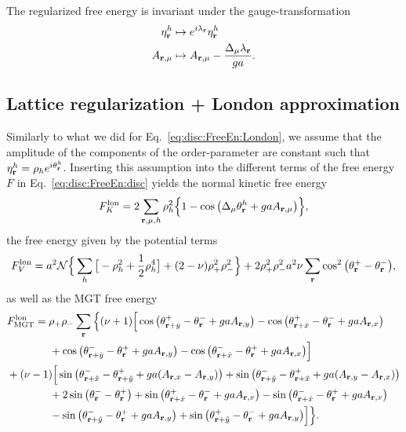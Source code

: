 The regularized free energy is invariant under the gauge-transformation
\begin{subequations}
  \begin{align}
	\eta^h_{\boldsymbol{\mathbf{r}}}&\mapsto e^{i\lambda_{\boldsymbol{\mathbf{r}}}}\eta^h_{\boldsymbol{\mathbf{r}}} \label{eq:disc:Gauge:disc:A}\\
	A_{{\boldsymbol{\mathbf{r}}},\mu} &\mapsto A_{{\boldsymbol{\mathbf{r}}},\mu} - \frac{\Delta_\mu\lambda_{\boldsymbol{\mathbf{r}}}}{ga}.
	\label{eq:disc:Gauge:disc:A}
  \end{align}
  \label{eq:disc:Gauge:disc}
\end{subequations}

\subsection{Lattice regularization + London approximation}

Similarly to what we did for Eq.~\eqref{eq:disc:FreeEn:London}, we assume that the amplitude of the components of the order-parameter are constant such that $\eta^h_{\boldsymbol{\mathbf{r}}} = \rho_he^{i\theta^h_{\boldsymbol{\mathbf{r}}}}$.
Inserting this assumption into the different terms of the free energy $F$ in Eq.~\eqref{eq:disc:FreeEn:disc} yields the normal kinetic free energy
\begin{equation}
  F^\text{lon}_K = 2\sum_{{\boldsymbol{\mathbf{r}}},\mu,h}\rho_h^2\Big\{1-\cos\big(\Delta_\mu\theta^h_{\boldsymbol{\mathbf{r}}}+gaA_{{\boldsymbol{\mathbf{r}}},\mu}\big)\Big\},
  \label{eq:disc:FreeEn:lonDis:K}
\end{equation}
the free energy given by the potential terms
\begin{equation}
  F^\text{lon}_V = a^2\mathcal{N}\Big\{\sum_h\big[-\rho_h^2 + \frac{1}{2}\rho_h^4\big] + (2-\nu)\rho_+^2\rho_-^2\Big\} + 2\rho_+^2\rho_-^2a^2\nu\sum_{\boldsymbol{\mathbf{r}}}\cos^2\big(\theta^+_{\boldsymbol{\mathbf{r}}}-\theta^-_{\boldsymbol{\mathbf{r}}}\big),
  \label{eq:disc:freeEn:lonDis:V}
\end{equation}
as well as the MGT free energy
\begin{equation}
  \begin{split}
	&F^\text{lon}_\text{MGT} = \rho_+\rho_-\sum_{\boldsymbol{\mathbf{r}}}\Big\{(\nu+1)\Big[\cos\big(\theta^+_{{\boldsymbol{\mathbf{r}}}+\hat{y}} - \theta^-_{\boldsymbol{\mathbf{r}}} + gaA_{{\boldsymbol{\mathbf{r}}},y}\big) - \cos\big(\theta^+_{{\boldsymbol{\mathbf{r}}}+\hat{x}}-\theta^-_{\boldsymbol{\mathbf{r}}} + gaA_{{\boldsymbol{\mathbf{r}}},x}\big)\\
	&\qquad\qquad+ \cos\big(\theta^-_{{\boldsymbol{\mathbf{r}}}+\hat{y}} - \theta^+_{\boldsymbol{\mathbf{r}}} + gaA_{{\boldsymbol{\mathbf{r}}},y}\big) - \cos\big(\theta^-_{{\boldsymbol{\mathbf{r}}}+\hat{x}} - \theta^+_{\boldsymbol{\mathbf{r}}} + gaA_{{\boldsymbol{\mathbf{r}}},x}\big)\Big]\\
	&+(\nu-1)\Big[\sin\big(\theta^-_{{\boldsymbol{\mathbf{r}}}+\hat{x}} - \theta^+_{{\boldsymbol{\mathbf{r}}}+\hat{y}} + ga(A_{{\boldsymbol{\mathbf{r}}},x} - A_{{\boldsymbol{\mathbf{r}}},y})\big) + \sin\big(\theta^-_{{\boldsymbol{\mathbf{r}}}+\hat{y}} - \theta^+_{{\boldsymbol{\mathbf{r}}}+\hat{x}} + ga(A_{{\boldsymbol{\mathbf{r}}},y} - A_{{\boldsymbol{\mathbf{r}}},x})\big)\\
	  &\qquad\qquad+ 2\sin\big(\theta^-_{\boldsymbol{\mathbf{r}}}-\theta^+_{\boldsymbol{\mathbf{r}}}\big) + \sin\big(\theta^+_{{\boldsymbol{\mathbf{r}}}+\hat{x}} - \theta^-_{\boldsymbol{\mathbf{r}}}+gaA_{{\boldsymbol{\mathbf{r}}},x}\big) - \sin\big(\theta^-_{{\boldsymbol{\mathbf{r}}}+\hat{x}} - \theta^+_{\boldsymbol{\mathbf{r}}} +gaA_{{\boldsymbol{\mathbf{r}}},x}\big)\\
	&\qquad\qquad-\sin\big(\theta^-_{{\boldsymbol{\mathbf{r}}}+\hat{y}} - \theta^+_{\boldsymbol{\mathbf{r}}} + gaA_{{\boldsymbol{\mathbf{r}}},y}\big) + \sin\big(\theta^+_{{\boldsymbol{\mathbf{r}}}+\hat{y}} - \theta^-_{\boldsymbol{\mathbf{r}}} + gaA_{{\boldsymbol{\mathbf{r}}},y}\big)\Big]\Big\}.
  \end{split}
  \label{eq:disc:freeEn:longDis:MGT}
\end{equation}
